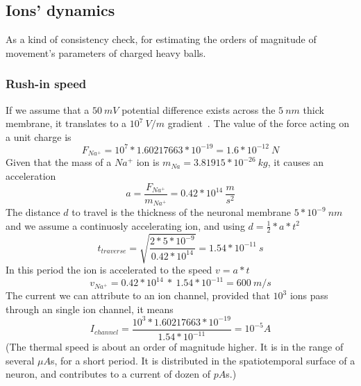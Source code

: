
\subsection[Dynamics]{Ions' dynamics\label{sec:Physics-ElectrodiffusionDynamics}\label{sec:Physics-Speculations}}
As a kind of consistency check, for estimating the orders of magnitude of movement's parameters of charged heavy balls.


\subsubsection{Rush-in speed\label{sec:Physics-RushInSpeedD}}
If we assume that a $50\ mV$ potential difference exists across the 
$5\ nm$ thick membrane, it translates to a $10^7\ V/m$ gradient~\cite{MolecularBiology:2002}.
The value of the force acting on a unit charge is
\begin{equation}
F_{Na^+}= 10^7 *1.60217663* 10^{-19} = 1.6*10^{-12}\ N
\end{equation}
\noindent
Given that the mass of a $Na^+$ ion is $m_{Na} = 3.81915* 10^{-26}\ kg$, it causes an acceleration
\begin{equation}
a=\frac{F_{Na^+}}{m_{Na^+}} = 0.42 * 10^{14}\ \frac{m}{s^{2}}
\label{eq:Physics-RushInAceleration}
\end{equation}
\noindent
The distance $d$ to travel is the thickness of the neuronal membrane $5*10^{-9}\ nm$
and we assume a continuosly accelerating ion, and using $d=\frac{1}{2}*a*t^2$
\begin{equation}
t_{traverse} = \sqrt{\frac{2*5*10^{-9}}{0.42*10^{14}}} = 1.54*10^{-11}\ s
\end{equation}
\noindent
In this period the ion is accelerated to the speed  $v=a*t$
\begin{equation}
v_{Na^+} = 0.42 * 10^{14}\ *\ 1.54*10^{-11} = 600\ m/s
\end{equation}
The current we can attribute to an ion channel,
provided that $10^3$ ions pass through an single ion channel, it means
\begin{equation}
I_{channel} = \frac{10^3 * 1.60217663* 10^{-19}}{1.54*10^{-11}} = 10^{-5} A
\end{equation}
\noindent
(The thermal speed is about an order of magnitude higher.
It is in the range of several $\mu A$s, for a short period. It is distributed in the 
spatiotemporal surface of a neuron, and contributes to a current of dozen of $pA$s.)

